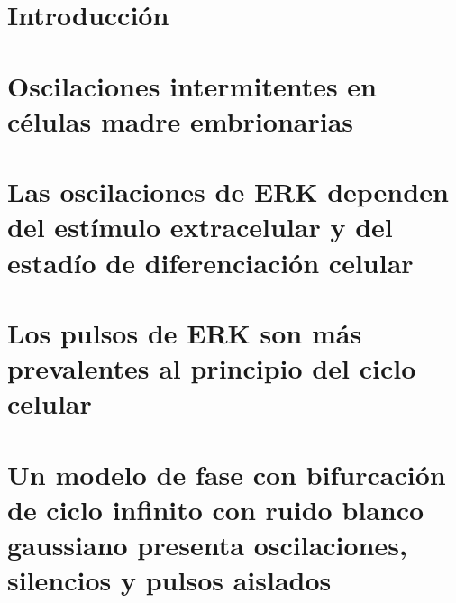 \documentclass[graybox,envcountchap,sectrefs]{svmono}
\begin{document}
\frontmatter%



%



\tableofcontents



\mainmatter%

\chapter{Introducción}
\label{ch1}


\chapter{Oscilaciones intermitentes en células madre embrionarias}
\label{ch2}


\chapter{Las oscilaciones de ERK dependen del estímulo extracelular y del estadío de diferenciación celular}
\label{ch3}


\chapter{Los pulsos de ERK son más prevalentes al principio del ciclo celular}
\label{ch4}


\chapter{Un modelo de fase con bifurcación de ciclo infinito con ruido blanco gaussiano presenta oscilaciones, silencios y pulsos aislados}
\label{ch5}

\end{document}
